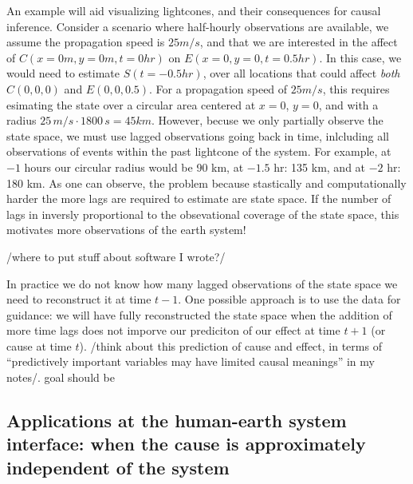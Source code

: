 \documentclass[12pt]{article}
\begin{document}
An example will aid visualizing lightcones, and their consequences for
causal inference. Consider a scenario where half-hourly observations
are available, we assume the propagation speed is $25 m/s$, and that
we are interested in the affect of $C(x=0 m, y=0 m, t=0 hr)$ on
$E(x=0, y=0, t=0.5 hr)$. In this case, we would need to estimate
$S(t=-0.5 hr)$, over all locations that could affect \emph{both}
$C(0,0,0)$ and $E(0,0,0.5)$.  For a propagation speed of $25 m/s$,
this requires esimating the state over a circular area centered at
$x=0$, $y=0$, and with a radius $25 \, m/s \cdot 1800 \, s = 45
km$. However, becuse we only partially observe the state space, we
must use lagged observations going back in time, inlcluding all
observations of events within the past lightcone of the system. For
example, at $-1$ hours our circular radius would be 90 km, at $-1.5$
hr: 135 km, and at $-2$ hr: 180 km. As one can observe, the problem
because stastically and computationally harder the more lags are
required to estimate are state space. If the number of lags in
inversly proportional to the obsevational coverage of the state space,
this motivates more observations of the earth system!

/where to put stuff about software I wrote?/

In practice we do not know how many lagged observations of the state
space we need to reconstruct it at time $t-1$. One possible approach
is to use the data for guidance: we will have fully reconstructed the
state space when the addition of more time lags does not imporve our
prediciton of our effect at time \(t+1\) (or cause at time
$t$). /think about this prediction of cause and effect, in terms of
``predictively important variables may have limited causal meanings''
in my notes/. goal should be


\subsection{Applications at the human-earth system interface: when the
cause is approximately independent of the system}
\label{human}
\end{document}
